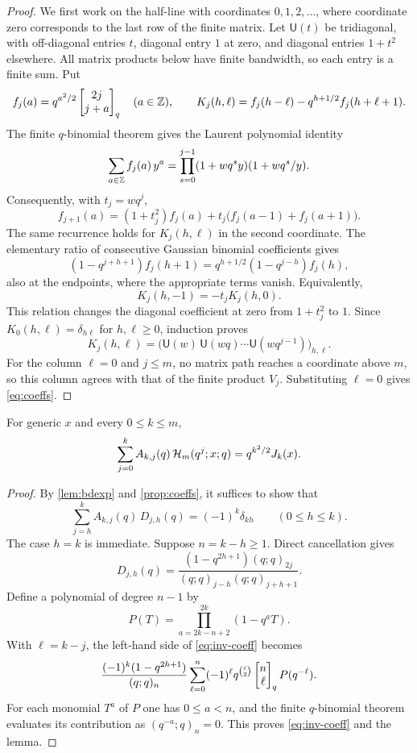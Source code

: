 \begin{proof}
We first work on the half-line with coordinates $0,1,2,\dots$, where coordinate zero corresponds to the last row of the finite matrix. Let $\mathsf U(t)$ be tridiagonal, with off-diagonal entries $t$, diagonal entry $1$ at zero, and diagonal entries $1+t^2$ elsewhere. All matrix products below have finite bandwidth, so each entry is a finite sum. Put
\[
f_j(a)=q^{a^2/2}\begin{bmatrix}2j\\j+a\end{bmatrix}_q\quad(a\in\mathbb{Z}),\qquad K_j(h,\ell)=f_j(h-\ell)-q^{h+1/2}f_j(h+\ell+1).
\]
The finite $q$-binomial theorem gives the Laurent polynomial identity
\[
\sum_{a\in\mathbb{Z}}f_j(a)\,y^a=\prod_{s=0}^{j-1}(1+wq^sy)(1+wq^s/y).
\]
Consequently, with $t_j=wq^j$,
\[
f_{j+1}(a)=(1+t_j^2)f_j(a)+t_j\bigl(f_j(a-1)+f_j(a+1)\bigr).
\]
The same recurrence holds for $K_j(h,\ell)$ in the second coordinate. The elementary ratio of consecutive Gaussian binomial coefficients gives
\[
(1-q^{j+h+1})f_j(h+1)=q^{h+1/2}(1-q^{j-h})f_j(h),
\]
also at the endpoints, where the appropriate terms vanish. Equivalently,
\[
K_j(h,-1)=-t_jK_j(h,0).
\]
This relation changes the diagonal coefficient at zero from $1+t_j^2$ to $1$. Since $K_0(h,\ell)=\delta_{h\ell}$ for $h,\ell\ge0$, induction proves
\[
K_j(h,\ell)=\bigl(\mathsf U(w)\,\mathsf U(wq)\cdots\mathsf U(wq^{j-1})\bigr)_{h,\ell}.
\]
For the column $\ell=0$ and $j\le m$, no matrix path reaches a coordinate above $m$, so this column agrees with that of the finite product $V_j$. Substituting $\ell=0$ gives \eqref{eq:coeffs}.
\end{proof}

\begin{lemma}\label{lem:inverse}
For generic $x$ and every $0\le k\le m$,
\begin{equation}\label{eq:inverse}
\sum_{j=0}^kA_{k,j}(q)\,\mathcal{H}_m(q^j;x;q)=q^{k^2/2}J_k(x).
\end{equation}
\end{lemma}

\begin{proof}
By \cref{lem:bdexp} and \cref{prop:coeffs}, it suffices to show that
\begin{equation}\label{eq:inv-coeff}
\sum_{j=h}^kA_{k,j}(q)\,D_{j,h}(q)=(-1)^k\delta_{kh}\qquad(0\le h\le k).
\end{equation}
The case $h=k$ is immediate. Suppose $n=k-h\ge1$. Direct cancellation gives
\[
D_{j,h}(q)=\frac{(1-q^{2h+1})(q;q)_{2j}}{(q;q)_{j-h}(q;q)_{j+h+1}}.
\]
Define a polynomial of degree $n-1$ by
\[
P(T)=\prod_{a=2k-n+2}^{2k}(1-q^aT).
\]
With $\ell=k-j$, the left-hand side of \eqref{eq:inv-coeff} becomes
\[
\frac{(-1)^k(1-q^{2h+1})}{(q;q)_n}\sum_{\ell=0}^n(-1)^\ell q^{\binom\ell2}\begin{bmatrix}n\\\ell\end{bmatrix}_q P(q^{-\ell}).
\]
For each monomial $T^a$ of $P$ one has $0\le a<n$, and the finite $q$-binomial theorem evaluates its contribution as $(q^{-a};q)_n=0$. This proves \eqref{eq:inv-coeff} and the lemma.
\end{proof}

